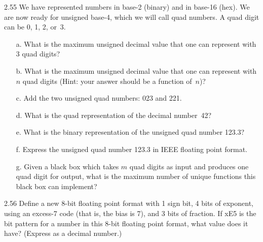 \documentclass{patt}
\begin{document}
\begin{exercises}
\item[2.55] We have represented numbers in base-2 (binary)
and in base-16 (hex). We are now ready for unsigned base-4,
which we will call quad numbers. A quad digit can be 0, 1, 2, or~3.
\begin{enumerate}[g.]
\item[a.] What is the maximum unsigned decimal value that one
can represent with 3 quad digits?
\item[b.] What is the maximum unsigned decimal value that one
can represent with $n$ quad digits (Hint: your answer should be a function of~$n$)?
\item[c.] Add the two unsigned quad numbers: 023 and 221.
\item[d.] What is the quad representation of the decimal
number~42?
\item[e.] What is the binary representation of the unsigned quad number 123.3?
\item[f.] Express the unsigned quad number 123.3 in IEEE
floating point format.
\item[g.] Given a black box which takes $m$ quad digits as
input and produces one quad digit for output, what is the
maximum number of unique functions this black box can implement?
\end{enumerate}

\item[2.56] Define a new 8-bit floating point format with 1
sign bit, 4 bits of exponent, using an excess-7 code (that is,
the bias is 7), and 3 bits of fraction. If xE5 is the bit
pattern for a number in this 8-bit floating point format, what value
does it have? (Express as a decimal number.)
\end{exercises}
\end{document}
